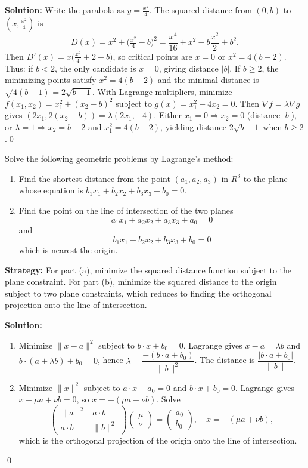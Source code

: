 \bigskip\noindent\textbf{Solution:}
Write the parabola as $y=\tfrac{x^2}{4}$. The squared distance from $(0,b)$ to $(x,\tfrac{x^2}{4})$ is
\[D(x)=x^2+\Big(\tfrac{x^2}{4}-b\Big)^2=\frac{x^4}{16}+x^2-b\frac{x^2}{2}+b^2.
\]
Then $D'(x)=x\Big(\tfrac{x^2}{4}+2-b\Big)$, so critical points are $x=0$ or $x^2=4(b-2)$. Thus: if $b<2$, the only candidate is $x=0$, giving distance $|b|$. If $b\ge 2$, the minimizing points satisfy $x^2=4(b-2)$ and the minimal distance is $\sqrt{4(b-1)}=2\sqrt{b-1}$.
With Lagrange multipliers, minimize $f(x_1,x_2)=x_1^2+(x_2-b)^2$ subject to $g(x)=x_1^2-4x_2=0$. Then $\nabla f=\lambda\nabla g$ gives $(2x_1,2(x_2-b))=\lambda(2x_1,-4)$. Either $x_1=0\Rightarrow x_2=0$ (distance $|b|$), or $\lambda=1\Rightarrow x_2=b-2$ and $x_1^2=4(b-2)$, yielding distance $2\sqrt{b-1}$ when $b\ge2$.\qed


\begin{problembox}
Solve the following geometric problems by Lagrange's method:
\begin{enumerate}[label=(\alph*)]
    \item Find the shortest distance from the point \((a_1, a_2, a_3)\) in \( R^3 \) to the plane whose equation is \( b_1x_1 + b_2x_2 + b_3x_3 + b_0 = 0 \).
    \item Find the point on the line of intersection of the two planes
    \[a_1x_1 + a_2x_2 + a_3x_3 + a_0 = 0\]
    and
    \[b_1x_1 + b_2x_2 + b_3x_3 + b_0 = 0\]
    which is nearest the origin.
\end{enumerate}
\end{problembox}

\noindent\textbf{Strategy:} For part (a), minimize the squared distance function subject to the plane constraint. For part (b), minimize the squared distance to the origin subject to two plane constraints, which reduces to finding the orthogonal projection onto the line of intersection.

\bigskip\noindent\textbf{Solution:}
\begin{enumerate}[label=(\alph*)]
    \item Minimize $\|x-a\|^2$ subject to $b\cdot x+b_0=0$. Lagrange gives $x-a=\lambda b$ and $b\cdot(a+\lambda b)+b_0=0$, hence $\lambda=\dfrac{-(b\cdot a+b_0)}{\|b\|^2}$. The distance is $\dfrac{|b\cdot a+b_0|}{\|b\|}$.
    \item Minimize $\|x\|^2$ subject to $a\cdot x+a_0=0$ and $b\cdot x+b_0=0$. Lagrange gives $x+\mu a+\nu b=0$, so $x=-(\mu a+\nu b)$. Solve
    \[\begin{pmatrix}\|a\|^2 & a\cdot b\\ a\cdot b & \|b\|^2\end{pmatrix}\begin{pmatrix}\mu\\ \nu\end{pmatrix}=\begin{pmatrix}a_0\\ b_0\end{pmatrix},\quad x=-(\mu a+\nu b),\]
    which is the orthogonal projection of the origin onto the line of intersection.
\end{enumerate}\qed


